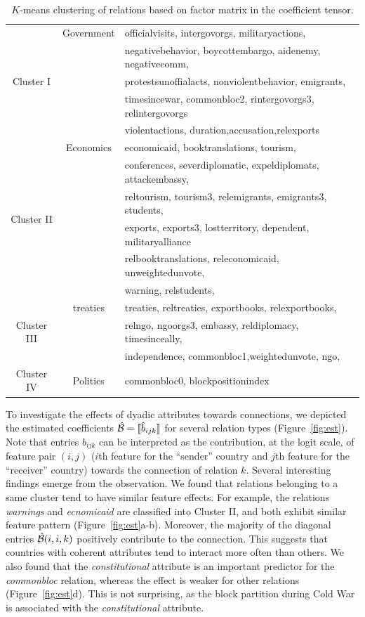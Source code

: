 \documentclass[12pt]{article}
\theoremstyle{plain}
\theoremstyle{definition}
\begin{document}
\begin{table}[H]
\begin{tabular}{c|c|l}
\hline
\multirow{5}{*}{Cluster I}  & Government &officialvisits, intergovorgs,  militaryactions,  \\
&&negativebehavior, boycottembargo, aidenemy, negativecomm, \\
&&protestsunoffialacts,    nonviolentbehavior, emigrants,  \\
&&timesincewar, commonbloc2, rintergovorgs3, relintergovorgs\\
&&violentactions, duration,accusation,relexports\\
\hline
\multirow{6}{*}{Cluster II}& Economics &economicaid, booktranslations, tourism,  \\
&& conferences, severdiplomatic, expeldiplomats, attackembassy, \\
&& reltourism, tourism3, relemigrants, emigrants3, students, \\
&&exports, exports3, lostterritory, dependent, militaryalliance  \\
&&relbooktranslations, releconomicaid, unweightedunvote, \\
&& warning, relstudents,\\
\hline
\multirow{3}{*}{Cluster III} & treaties &treaties, reltreaties, exportbooks, relexportbooks,  \\
&&relngo, ngoorgs3, embassy, reldiplomacy, timesinceally, \\
&&independence, commonbloc1,weightedunvote, ngo,\\
\hline
Cluster IV & Politics &commonbloc0, blockpositionindex\\
\hline
\end{tabular}
\caption{$K$-means clustering of relations based on factor matrix in the coefficient tensor.}\label{tab:s1}
\end{table}


To investigate the effects of dyadic attributes towards connections, we depicted the estimated coefficients $\hat {\mathcal{B}}=\llbracket \hat b_{ijk} \rrbracket$ for several relation types (Figure~\ref{fig:est}). Note that entries $\hat b_{ijk}$ can be interpreted as the contribution, at the logit scale, of feature pair $(i,j)$ ($i$th feature for the ``sender'' country and $j$th feature for the ``receiver'' country) towards the connection of relation $k$.  Several interesting findings emerge from the observation. We found that relations belonging to a same cluster tend to have similar feature effects. For example, the relations \emph{warnings} and \emph{ecnomicaid} are classified into Cluster II, and both exhibit similar feature pattern (Figure~\ref{fig:est}a-b). Moreover, the majority of the diagonal entries $\hat {\mathcal{B}}(i,i,k)$ positively contribute to the connection. This suggests that countries with coherent attributes tend to interact more often than others. We also found that the \emph{constitutional} attribute is an important predictor for the \emph{commonbloc} relation, whereas the effect is weaker for other relations (Figure~\ref{fig:est}d). This is not surprising, as the block partition during Cold War is associated with the \emph{constitutional} attribute. 
\end{document}
